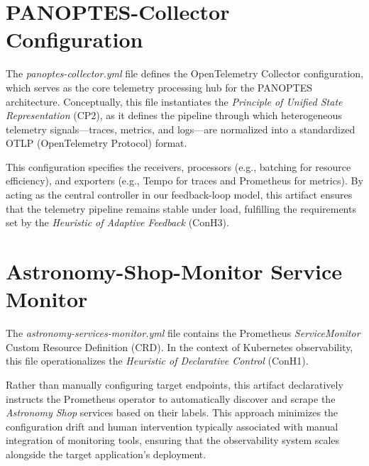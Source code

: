 \section{PANOPTES-Collector Configuration}
\label{sec:panoptes-collector-conf}

The \textit{panoptes-collector.yml} file defines the OpenTelemetry Collector configuration, which serves as the core telemetry processing hub for the PANOPTES architecture. Conceptually, this file instantiates the \textit{Principle of Unified State Representation} (CP2), as it defines the pipeline through which heterogeneous telemetry signals---traces, metrics, and logs---are normalized into a standardized OTLP (OpenTelemetry Protocol) format.

This configuration specifies the receivers, processors (e.g., batching for resource efficiency), and exporters (e.g., Tempo for traces and Prometheus for metrics). By acting as the central controller in our feedback-loop model, this artifact ensures that the telemetry pipeline remains stable under load, fulfilling the requirements set by the \textit{Heuristic of Adaptive Feedback} (ConH3).



\section{Astronomy-Shop-Monitor Service Monitor}
\label{sec:astronomy-service-monitor-conf}

The \textit{astronomy-services-monitor.yml} file contains the Prometheus \textit{ServiceMonitor} Custom Resource Definition (CRD). In the context of Kubernetes observability, this file operationalizes the \textit{Heuristic of Declarative Control} (ConH1). 

Rather than manually configuring target endpoints, this artifact declaratively instructs the Prometheus operator to automatically discover and scrape the \textit{Astronomy Shop} services based on their labels. This approach minimizes the configuration drift and human intervention typically associated with manual integration of monitoring tools, ensuring that the observability system scales alongside the target application's deployment.

